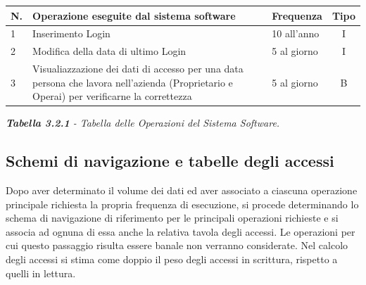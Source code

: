\documentclass{article}
\begin{document}
\newline
\begin{tabular}{p{} |p{}| p{}| c}\hline
    \textbf{N.} & \textbf{Operazione eseguite dal sistema software} & \textbf{Frequenza}  & \textbf{Tipo} \\\hline
    1&Inserimento Login & 10 all'anno & I \\\hline
    2&Modifica della data di ultimo Login& 5 al giorno & I\\\hline
    3&Visualiazzazione dei dati di accesso per una data persona che lavora nell'azienda (Proprietario e Operai) per verificarne la correttezza & 5 al giorno &B \\\hline
\end{tabular}
\newline
\textit{\textbf{Tabella 3.2.1}  - Tabella delle Operazioni del Sistema Software.}

\newpage
\subsection{Schemi di navigazione e tabelle degli accessi}
Dopo aver determinato il volume dei dati ed aver associato a ciascuna operazione principale richiesta la propria frequenza di esecuzione, si procede determinando lo schema di navigazione di riferimento per le principali operazioni richieste e si associa ad ognuna di essa anche la relativa tavola degli accessi. Le operazioni per cui questo passaggio risulta essere banale non verranno considerate. Nel calcolo degli accessi si stima come doppio il peso degli accessi in scrittura, rispetto a quelli in lettura.
\end{document}
